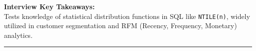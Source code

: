 \documentclass[11pt,a4paper]{article}
\begin{document}
\vspace{0.15cm}
\noindent\textbf{Interview Key Takeaways:} \\
Tests knowledge of statistical distribution functions in SQL like \texttt{NTILE(n)}, widely utilized in customer segmentation and RFM (Recency, Frequency, Monetary) analytics.

\vspace{0.4cm}
\noindent\rule{\textwidth}{0.4pt}
\vspace{0.4cm}
\end{document}
